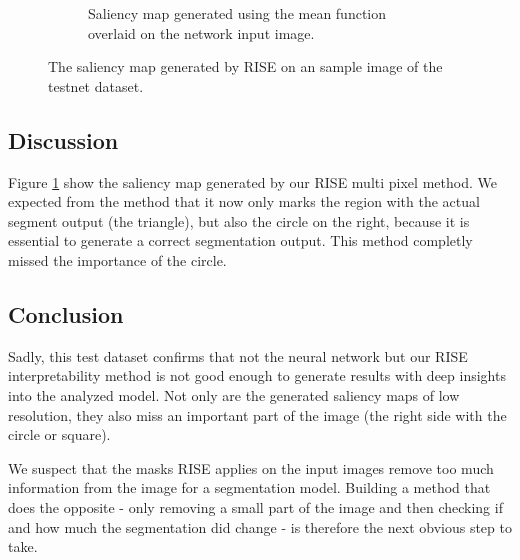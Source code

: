 \begin{figure}[H]
\begin{subfigure}{.5\textwidth}
        \caption{Saliency map generated using the mean function overlaid on the network input image.}
    \end{subfigure}
    \caption{The saliency map generated by RISE on an sample image of the testnet dataset.}
    \label{testnet_rise_mean}
\end{figure}

\subsection{Discussion}
Figure \ref{testnet_rise_mean} show the saliency map generated by our RISE multi pixel method. We expected from the method that it now only marks the region with the actual segment output (the triangle), but also the circle on the right, because it is essential to generate a correct segmentation output. This method completly missed the importance of the circle.

\subsection{Conclusion}
Sadly, this test dataset confirms that not the neural network but our RISE interpretability method is not good enough to generate results with deep insights into the analyzed model. Not only are the generated saliency maps of low resolution, they also miss an important part of the image (the right side with the circle or square).

We suspect that the masks RISE applies on the input images remove too much information from the image for a segmentation model. Building a method that does the opposite - only removing a small part of the image and then checking if and how much the segmentation did change - is therefore the next obvious step to take.
